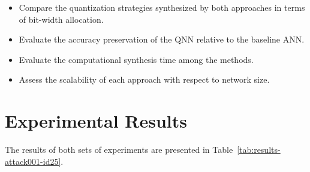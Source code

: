 \begin{itemize}
    \item Compare the quantization strategies synthesized by both approaches in terms of bit-width allocation.
    \item Evaluate the accuracy preservation of the QNN relative to the baseline ANN.
    \item Evaluate the computational synthesis time among the methods.
    \item Assess the scalability of each approach with respect to network size.
\end{itemize}

\section{Experimental Results}

The results of both sets of experiments are presented in Table~\ref{tab:results-attack001-id25}.

